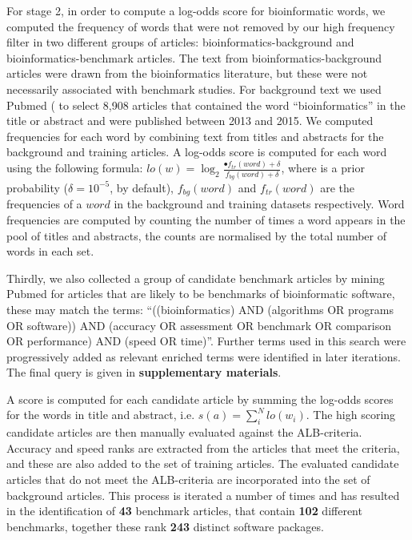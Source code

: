 \documentclass[fleqn,10pt]{SelfArx} %
\begin{document}
For stage 2, in order to compute a log-odds score for bioinformatic words, we computed the frequency of words that were not removed by our high frequency filter in two different groups of articles: bioinformatics-background and bioinformatics-benchmark articles. The text from bioinformatics-background articles were drawn from the bioinformatics literature, but these were not necessarily associated with benchmark studies. For background text we used Pubmed (\cite{Sayers2010-vm,McEntyre2001-fl} to select 8,908 articles that contained the word “bioinformatics” in the title or abstract and were published between 2013 and 2015. We computed frequencies for each word by combining text from titles and abstracts for the background and training articles. A log-odds score is computed for each word using the following formula: $lo(w)=\log_2\frac{•f_{tr}(word)+\delta}{f_{bg}(word)+\delta}$, where  is a prior probability ($\delta = 10^{-5}$, by default), $f_{bg}(word)$ and $f_{tr}(word)$ are the frequencies of a $word$ in the background and training datasets respectively. Word frequencies are computed by counting the number of times a word appears in the pool of titles and abstracts, the counts are normalised by the total number of words in each set. 

Thirdly, we also collected a group of candidate benchmark articles by mining Pubmed for articles that are likely to be benchmarks of bioinformatic software, these may match the terms: “((bioinformatics) AND (algorithms OR programs OR software)) AND (accuracy OR assessment OR benchmark OR comparison OR performance) AND (speed OR time)”. Further terms used in this search were progressively added as relevant enriched terms were identified in later iterations. The final query is given in \textbf{supplementary materials}.

A score is computed for each candidate article by summing the log-odds scores for the words in title and abstract, i.e. $s(a)=\sum_i^Nlo(w_i)$. The high scoring candidate articles are then manually evaluated against the ALB-criteria. Accuracy and speed ranks are extracted from the articles that meet the criteria, and these are also added to the set of training articles. The evaluated candidate articles that do not meet the ALB-criteria are incorporated into the set of background articles. This process is iterated a number of times and has resulted in the identification of \textbf{{\color{black}43}} benchmark articles, that contain \textbf{{\color{black}102}} different benchmarks, together these rank \textbf{{\color{black}243}} distinct software packages.
\end{document}
